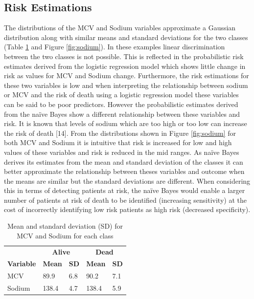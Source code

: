 \documentclass[a4paper,UKenglish]{oasics-v2016}
\begin{document}
\subsection*{Risk Estimations}
The distributions of the MCV and Sodium variables approximate a Gaussian distribution along with similar means and standard deviations for the two classes (Table \ref{table:means} and Figure \ref{fig:sodium}). In these examples linear discrimination between the two classes is not possible. This is reflected in the probabilistic risk estimates derived from the logistic regression model which shows little change in risk as values for MCV and Sodium change. Furthermore, the risk estimations for these two variables is low and when interpreting 
the relationship between sodium or MCV and the risk of death using a logistic regression model these variables can be said to be poor predictors. However the probabilistic estimates derived from the naïve Bayes show a different relationship between these variables and risk. It is known that levels of sodium which are too high or too low can increase the risk of death [14]. From the distributions shown in Figure \ref{fig:sodium} for both MCV and Sodium it is intuitive that risk is increased for low and high values of these variables and risk is reduced in the mid ranges. As naïve Bayes derives its estimates from the mean and standard deviation of the classes it can better approximate the relationship between theses variables and outcome when the means are similar but the standard deviations are different. When considering this in terms of detecting patients at risk, the naïve Bayes would enable a larger number of patients at risk of death to be identified (increasing sensitivity) at the cost of incorrectly identifying low risk patients as high risk (decreased specificity). 


\begin{table}[h!]
\centering
\caption{Mean and standard deviation (SD) for MCV and Sodium for each class}
\label{table:means}
\begin{tabular}{lll|ll}
\hline
\textbf{}            & \multicolumn{2}{c|}{\textbf{Alive}}  & \multicolumn{2}{c}{\textbf{Dead}} \\

\textbf{Variable}        & \textbf{Mean}         & \textbf{SD}        & \textbf{Mean}         & \textbf{SD}         \\
\hline       
MCV     & 89.9        & 6.8       & 90.2        & 7.1       \\
Sodium  & 138.4        & 4.7       & 138.4        & 5.9       \\
\hline
\end{tabular}
\end{table}
\end{document}
